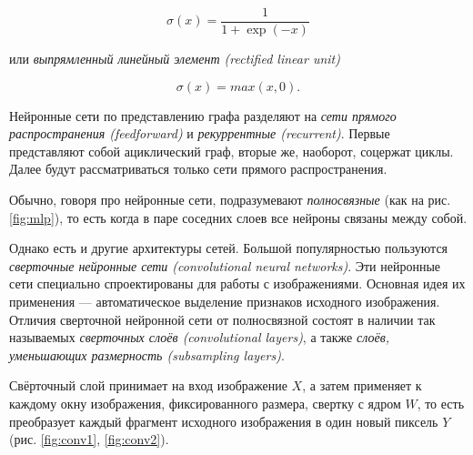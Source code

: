 \documentclass[12pt]{article}
\begin{document}
\begin{equation}
\sigma(x) = \frac{1}{1 + \exp(-x)}
\end{equation}

или \textit{выпрямленный линейный элемент (rectified linear unit)}

\begin{equation}
\sigma(x) = max(x, 0).
\end{equation}


Нейронные сети по представлению графа разделяют на \textit{сети прямого распространения (feedforward)} и \textit{рекуррентные (recurrent)}. Первые представляют собой ациклический граф, вторые же, наоборот, соцержат циклы. Далее будут рассматриваться только сети прямого распространения.

Обычно, говоря про нейронные сети, подразумевают \textit{полносвязные} (как на рис. \ref{fig:mlp}), то есть когда в паре соседних слоев все нейроны связаны между собой. 

Однако есть и другие архитектуры сетей. Большой популярностью пользуются \textit{сверточные нейронные сети (convolutional neural networks)}. Эти нейронные сети специально спроектированы для работы с изображениями. Основная идея их применения --- автоматическое выделение признаков исходного изображения. Отличия сверточной нейронной сети от полносвязной состоят в наличии так называемых \textit{сверточных слоёв (convolutional layers)}, а также \textit{слоёв, уменьшающих размерность (subsampling layers)}. 

Свёрточный слой принимает на вход изображение $X$, а затем применяет к каждому окну изображения, фиксированного размера, свертку с ядром $W$, то есть преобразует каждый фрагмент исходного изображения в один новый пиксель $Y$ (рис. \ref{fig:conv1}, \ref{fig:conv2}).
\end{document}
